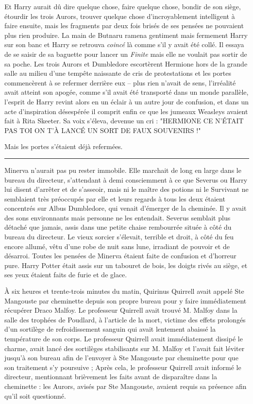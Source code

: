Et Harry aurait dû dire quelque chose, faire quelque chose, bondir de son siège, étourdir les trois Aurors, trouver quelque chose d'incroyablement intelligent à faire ensuite, mais les fragments par deux fois brisés de ses pensées ne pouvaient plus rien produire. La main de Butnaru ramena gentiment mais fermement Harry sur son banc et Harry se retrouva \emph{coincé}  là comme s'il y avait été collé. Il essaya de se saisir de sa baguette pour lancer un \emph{Finite}  mais elle ne voulait pas sortir de sa poche. Les trois Aurors et Dumbledore escortèrent Hermione hors de la grande salle au milieu d'une tempête naissante de cris de protestations et les portes commencèrent à se refermer derrière eux – plus rien n'avait de sens, l'irréalité avait atteint son apogée, comme s'il avait été transporté dans un monde parallèle, l'esprit de Harry revint alors en un éclair à un autre jour de confusion, et dans un acte d'inspiration désespérée il comprit enfin ce que les jumeaux Weasleys avaient fait à Rita Skeeter. Sa voix s'éleva, devenue un cri : "HERMIONE CE N'ÉTAIT PAS TOI ON T'À LANCÉ UN SORT DE FAUX SOUVENIRS !"

Mais les portes s'étaient déjà refermées.
\par\noindent\rule{\textwidth}{0.4pt}
Minerva n'aurait pas pu rester immobile. Elle marchait de long en large dans le bureau du directeur, s'attendant à demi consciemment à ce que Severus ou Harry lui disent d'arrêter et de s'asseoir, mais ni le maître des potions ni le Survivant ne semblaient très préoccupés par elle et leurs regards à tous les deux étaient concentrés sur Albus Dumbledore, qui venait d'émerger de la cheminée. Il y avait des sons environnants mais personne ne les entendait. Severus semblait plus détaché que jamais, assis dans une petite chaise rembourrée située à côté du bureau du directeur. Le vieux sorcier s'élevait, terrible et droit, à côté du feu encore allumé, vêtu d'une robe de nuit sans lune, irradiant de pouvoir et de désarroi. Toutes les pensées de Minerva étaient faite de confusion et d'horreur pure. Harry Potter était assis sur un tabouret de bois, les doigts rivés au siège, et ses yeux étaient faits de furie et de glace.

À six heures et trente-trois minutes du matin, Quirinus Quirrell avait appelé Ste Mangouste par cheminette depuis son propre bureau pour y faire immédiatement récupérer Draco Malfoy. Le professeur Quirrell avait trouvé M. Malfoy dans la salle des trophées de Poudlard, à l'article de la mort, victime des effets prolongés d'un sortilège de refroidissement sanguin qui avait lentement abaissé la température de son corps. Le professeur Quirrell avait immédiatement dissipé le charme, avait lancé des sortilèges stabilisants sur M. Malfoy et l'avait fait léviter jusqu'à son bureau afin de l'envoyer à Ste Mangouste par cheminette pour que son traitement s'y poursuive ; Après cela, le professeur Quirrell avait informé le directeur, mentionnant brièvement les faits avant de disparaître dans la cheminette : les Aurors, avisés par Ste Mangouste, avaient requis sa présence afin qu'il soit questionné.

